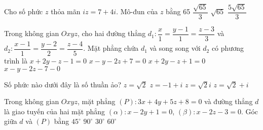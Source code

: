 \begin{ex}%
Cho số phức $z$ thỏa mãn $iz = 7+4i$. Mô-đun của $z$ bằng
\choice
{65}
{$\dfrac{\sqrt{65}}{3}$}
{\True $\sqrt{65}$}
{$\dfrac{5\sqrt{65}}{3}$}
\end{ex}

\begin{ex}%
Trong không gian $Oxyz$, cho hai đường thẳng $d_1\colon \dfrac{x}{1}=\dfrac{y-1}{1}=\dfrac{z-3}{3}$ và $d_2\colon \dfrac{x-1}{1}=\dfrac{y-2}{2}=\dfrac{z-4}{5}$. Mặt phẳng chứa $d_1$ và song song với $d_2$ có phương trình là
\choice
{$x+2y-z-1=0$}
{$x-y-2z+7=0$}
{\True $x+2y-z+1=0$}
{$x-y-2z-7-0$}
\end{ex}

\begin{ex}%
Số phức nào dưới đây là số thuần ảo?
\choice
{$z=\sqrt{2}$}
{$z=-1+i$}
{\True $z=\sqrt{2}i$}
{$z=\sqrt{2}+i$}
\end{ex}

\begin{ex}%
Trong không gian $Oxyz$, mặt phẳng $(P) \colon 3x+4y+5z+8=0$ và đường thẳng $d$ là giao tuyến của hai mặt phẳng $(\alpha) \colon x-2y+1=0$, $(\beta) \colon x-2z-3=0$. Góc giữa $d$ và $(P)$ bằng
\choice
{$45^\circ$}
{$90^\circ$}
{$30^\circ$}
{\True $60^\circ$}
\end{ex}

